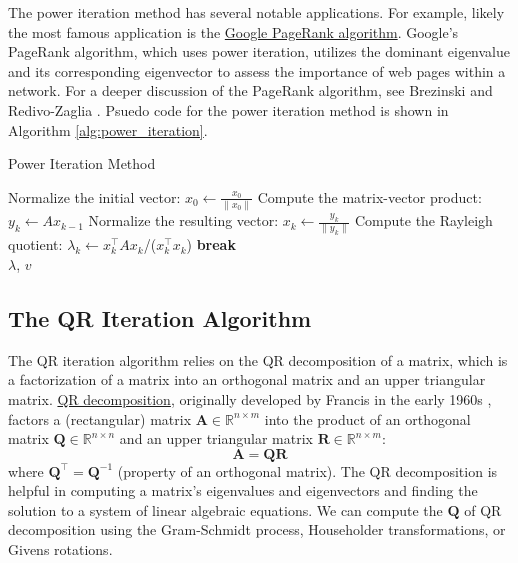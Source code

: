 \documentclass{article}[11pt]
\begin{document}
The power iteration method has several notable applications. For example, likely the most famous application is the \href{https://en.wikipedia.org/wiki/PageRank}{Google PageRank algorithm}.
Google's PageRank algorithm, which uses power iteration, utilizes the dominant eigenvalue and its corresponding eigenvector to assess the importance of web pages within a network.
For a deeper discussion of the PageRank algorithm, see Brezinski and Redivo-Zaglia \citep{Brezinski:2006}. Psuedo code for the power iteration method is shown in Algorithm \ref{alg:power_iteration}.
\begin{algorithm}[H]
   \caption{Power Iteration Method}\label{alg:power_iteration}
\begin{algorithmic}[1]
   
   \State Normalize the initial vector: $x_0 \leftarrow \frac{x_0}{\|x_0\|}$
       \State Compute the matrix-vector product: $y_k \leftarrow A x_{k-1}$
       \State Normalize the resulting vector: $x_k \leftarrow \frac{y_k}{\|y_k\|}$
       \State Compute the Rayleigh quotient: $\lambda_k \leftarrow x_k^\top A x_k$/($x_k^\top x_k$)
           \State \textbf{break}
       \EndIf
   \EndFor
   \\
   \Return $\lambda$, $v$
   \end{algorithmic}
\end{algorithm}

\subsection{The QR Iteration Algorithm}
The QR iteration algorithm relies on the QR decomposition of a matrix, which is a factorization of a matrix into an orthogonal matrix and an upper triangular matrix.
\href{https://en.wikipedia.org/wiki/QR_decomposition}{QR decomposition}, originally developed by Francis in the early 1960s \cite{Francis-QR-1961, Francis-QR-1962}, factors a (rectangular) matrix $\mathbf{A}\in\mathbb{R}^{n\times{m}}$ 
into the product of an orthogonal matrix $\mathbf{Q}\in\mathbb{R}^{n\times{n}}$ and 
an upper triangular matrix $\mathbf{R}\in\mathbb{R}^{n\times{m}}$:
\begin{equation}
\mathbf{A} = \mathbf{Q}\mathbf{R}
\end{equation}
where $\mathbf{Q}^{\top} = \mathbf{Q}^{-1}$ (property of an orthogonal matrix). 
The QR decomposition is helpful in computing a matrix's eigenvalues and eigenvectors and finding the solution to a system of linear algebraic equations. 
We can compute the $\mathbf{Q}$ of QR decomposition using the Gram-Schmidt process, Householder transformations, or Givens rotations.
\end{document}
